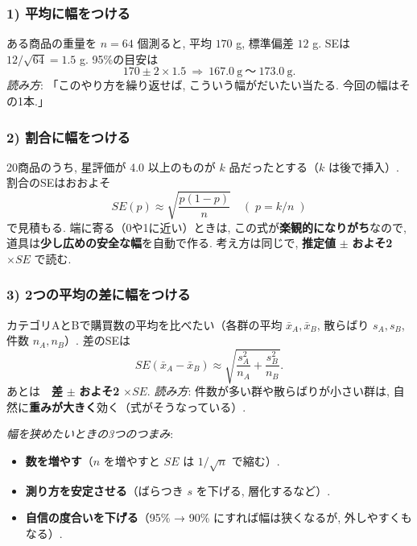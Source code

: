     \subsubsection*{1) 平均に幅をつける}
    ある商品の重量を $n=64$ 個測ると, 平均 $170$ g, 標準偏差 $12$ g.  
    SEは $12/\sqrt{64}=1.5$ g. 95\%の目安は
    \[
      170 \pm 2 \times 1.5 \ \Rightarrow\ 167.0\ \text{g} \ \text{〜} \ 173.0\ \text{g}.
    \]
    \textit{読み方}: 「このやり方を繰り返せば, こういう幅がだいたい当たる. 今回の幅はその1本.」

    \subsubsection*{2) 割合に幅をつける}
    20商品のうち, 星評価が 4.0 以上のものが $k$ 品だったとする（$k$ は後で挿入）.  
    割合のSEはおおよそ
    \[
      SE(p) \approx \sqrt{\frac{p(1-p)}{n}} \quad (\;p=k/n\;)
    \]
    で見積もる. 端に寄る（0や1に近い）ときは, この式が\textbf{楽観的になりがち}なので, 道具は\textbf{少し広めの安全な幅}を自動で作る.  
    考え方は同じで, \textbf{推定値} $\pm$ \textbf{およそ2} $\times SE$ で読む.

    \subsubsection*{3) 2つの平均の差に幅をつける}
    カテゴリAとBで購買数の平均を比べたい（各群の平均 $\bar{x}_A, \bar{x}_B$, 散らばり $s_A, s_B$, 件数 $n_A, n_B$）.  
    差のSEは
    \[
      SE(\bar{x}_A-\bar{x}_B) \approx \sqrt{\frac{s_A^2}{n_A}+\frac{s_B^2}{n_B}}.
    \]
    あとは\ \ \textbf{差} $\pm$ \textbf{およそ2} $\times SE$.  
    \textit{読み方}: 件数が多い群や散らばりが小さい群は, 自然に\textbf{重みが大きく}効く（式がそうなっている）.

    \vspace{0.5em}
    \textit{幅を狭めたいときの3つのつまみ}:
    \begin{itemize}
      \item \textbf{数を増やす}（$n$ を増やすと $SE$ は $1/\sqrt{n}$ で縮む）.
      \item \textbf{測り方を安定させる}（ばらつき $s$ を下げる, 層化するなど）.
      \item \textbf{自信の度合いを下げる}（95\% → 90\% にすれば幅は狭くなるが, 外しやすくもなる）.
    \end{itemize}

